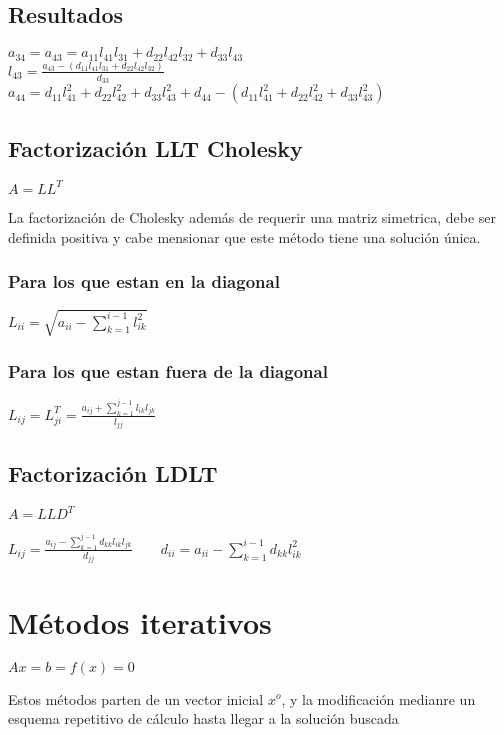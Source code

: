 \subsection*{Resultados}
$a_{34}=a_{43}=a_{11}l_{41}l_{31}+d_{22}l_{42}l_{32}+d_{33}l_{43}$ \\
$l_{43}=\frac{a_{43}-(d_{11}l_{41}l_{31}+d_{22}l_{42}l_{32})}{d_{33}}$ \\
$a_{44}=d_{11}l_{41}^2+d_{22}l_{42}^2+d_{33}l_{43}^2+d_{44}-(d_{11}l_{41}^2+d_{22}l_{42}^2+d_{33}l_{43}^2)$ \\
\subsection{Factorizaci\'on LLT Cholesky}
\begin{center}
$ A=LL^T$
\end{center}
La factorizaci\'on de Cholesky adem\'as de requerir una matriz simetrica, debe ser definida positiva y cabe mensionar que este m\'etodo tiene una soluci\'on \'unica.
\subsubsection*{Para los que estan en la diagonal}
\begin{center}
$L_{ii}=\sqrt{a_{ii}-\sum_{k=1}^{i-1}l_{ik}^2}$
\subsubsection*{Para los que estan fuera de la diagonal}
\begin{center}
$L_{ij}=L^T_{ji}=\frac{a_{ij}+\sum_{k=1}^{j-1}l_{ik}l_{jk}}{l_{jj}}$
\end{center}
\end{center}
\subsection{Factorizaci\'on LDLT}
\begin{center}
$ A=LLD^T $
\end{center}
\begin{center}
$L_{ij}=\frac{a_{ij}-\sum_{k=1}^{j-1}d_{kk}l_{ik}l_{jk}}{d_{jj}} \qquad d_{ii}=a_{ii}-\sum_{k=1}^{i-1}d_{kk}l_{ik}^2$
\end{center}
\section{M\'etodos iterativos }
\begin{center}
$Ax=b=f(x)=0$
\end{center}
Estos m\'etodos parten de un vector inicial $x^o$, y la modificaci\'on medianre un esquema repetitivo de c\'alculo hasta llegar a la soluci\'on buscada
